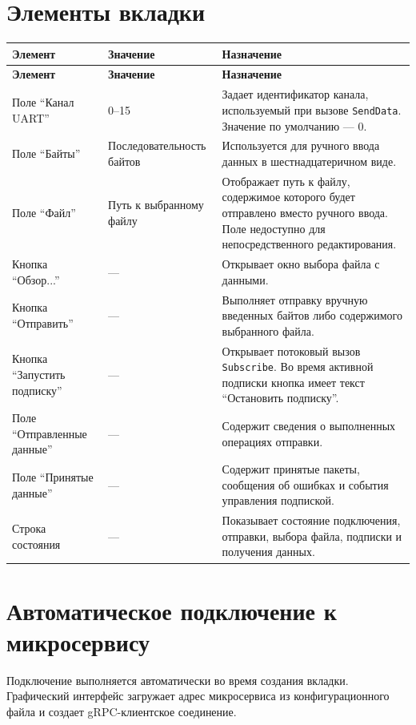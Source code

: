 \section{Элементы вкладки}

\begin{longtable}{|p{}|p{}|p{}|}
	\hline
	\textbf{Элемент} & \textbf{Значение} & \textbf{Назначение} \\
	\hline
	\endfirsthead
	\hline
	\textbf{Элемент} & \textbf{Значение} & \textbf{Назначение} \\
	\hline
	\endhead
	Поле ``Канал UART'' & 0--15 & Задает идентификатор канала, используемый при вызове \texttt{SendData}. Значение по умолчанию --- 0. \\
	\hline
	Поле ``Байты'' & Последовательность байтов & Используется для ручного ввода данных в шестнадцатеричном виде. \\
	\hline
	Поле ``Файл'' & Путь к выбранному файлу & Отображает путь к файлу, содержимое которого будет отправлено вместо ручного ввода. Поле недоступно для непосредственного редактирования. \\
	\hline
	Кнопка ``Обзор...'' & --- & Открывает окно выбора файла с данными. \\
	\hline
	Кнопка ``Отправить'' & --- & Выполняет отправку вручную введенных байтов либо содержимого выбранного файла. \\
	\hline
	Кнопка ``Запустить подписку'' & --- & Открывает потоковый вызов \texttt{Subscribe}. Во время активной подписки кнопка имеет текст ``Остановить подписку''. \\
	\hline
	Поле ``Отправленные данные'' & --- & Содержит сведения о выполненных операциях отправки. \\
	\hline
	Поле ``Принятые данные'' & --- & Содержит принятые пакеты, сообщения об ошибках и события управления подпиской. \\
	\hline
	Строка состояния & --- & Показывает состояние подключения, отправки, выбора файла, подписки и получения данных. \\
	\hline
\end{longtable}

\section{Автоматическое подключение к микросервису}

Подключение выполняется автоматически во время создания вкладки. Графический
интерфейс загружает адрес микросервиса из конфигурационного файла и создает
gRPC-клиентское соединение.

